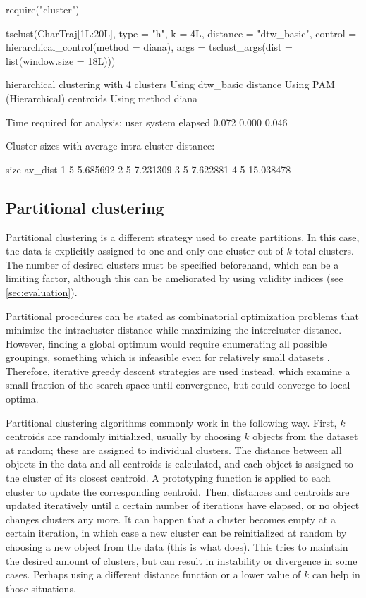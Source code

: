 \begin{example}
require("cluster")

tsclust(CharTraj[1L:20L], type = "h", k = 4L,
        distance = "dtw_basic",
        control = hierarchical_control(method = diana),
        args = tsclust_args(dist = list(window.size = 18L)))

hierarchical clustering with 4 clusters
Using dtw_basic distance
Using PAM (Hierarchical) centroids
Using method diana

Time required for analysis:
user  system elapsed
0.072   0.000   0.046

Cluster sizes with average intra-cluster distance:

size   av_dist
1    5  5.685692
2    5  7.231309
3    5  7.622881
4    5 15.038478
\end{example}

\subsection{Partitional clustering}
\label{sec:pc}

Partitional clustering is a different strategy used to create partitions.
In this case, the data is explicitly assigned to one and only one cluster out of $k$ total clusters.
The number of desired clusters must be specified beforehand,
which can be a limiting factor,
although this can be ameliorated by using validity indices (see \cref{sec:evaluation}).

Partitional procedures can be stated as combinatorial optimization problems that minimize the intracluster distance while maximizing the intercluster distance.
However, finding a global optimum would require enumerating all possible groupings,
something which is infeasible even for relatively small datasets \citep{hastie2009}.
Therefore, iterative greedy descent strategies are used instead,
which examine a small fraction of the search space until convergence,
but could converge to local optima.

Partitional clustering algorithms commonly work in the following way.
First, $k$ centroids are randomly initialized,
usually by choosing $k$ objects from the dataset at random;
these are assigned to individual clusters.
The distance between all objects in the data and all centroids is calculated,
and each object is assigned to the cluster of its closest centroid.
A prototyping function is applied to each cluster to update the corresponding centroid.
Then, distances and centroids are updated iteratively until a certain number of iterations have elapsed,
or no object changes clusters any more.
It can happen that a cluster becomes empty at a certain iteration,
in which case a new cluster can be reinitialized at random by choosing a new object from the data
(this is what \dtwclust{} does).
This tries to maintain the desired amount of clusters,
but can result in instability or divergence in some cases.
Perhaps using a different distance function or a lower value of $k$ can help in those situations.


